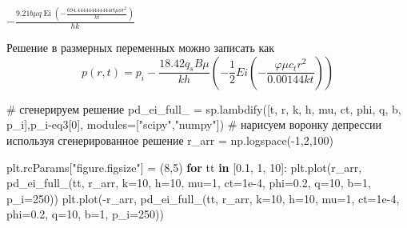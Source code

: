 \documentclass[
  russian,
  letterpaper,
  DIV=11,
  numbers=noendperiod,
  oneside]{scrartcl}
\newenvironment{Shaded}{\begin{snugshade}}{\end{snugshade}}
\newcommand{\CommentTok}[1]{\textcolor[rgb]{0.37,0.37,0.37}{#1}}
\newcommand{\ControlFlowTok}[1]{\textcolor[rgb]{0.00,0.23,0.31}{\textbf{#1}}}
\newcommand{\DecValTok}[1]{\textcolor[rgb]{0.68,0.00,0.00}{#1}}
\newcommand{\FloatTok}[1]{\textcolor[rgb]{0.68,0.00,0.00}{#1}}
\newcommand{\KeywordTok}[1]{\textcolor[rgb]{0.00,0.23,0.31}{\textbf{#1}}}
\newcommand{\NormalTok}[1]{\textcolor[rgb]{0.00,0.23,0.31}{#1}}
\newcommand{\OperatorTok}[1]{\textcolor[rgb]{0.37,0.37,0.37}{#1}}
\newcommand{\StringTok}[1]{\textcolor[rgb]{0.13,0.47,0.30}{#1}}
\begin{document}
$\displaystyle - \frac{9.21 b \mu q \operatorname{Ei}{\left(- \frac{694.444444444444 ct \mu \phi r^{2}}{k t} \right)}}{h k}$

Решение в размерных переменных можно записать как \[
p\left(r,t\right)=p_i-\frac{18.42q_sB\mu}{kh}\left(-\frac{1}{2} Ei \left(-\frac{\varphi\mu c_tr^2}{0.00144kt}\right)\right) 
\]

\begin{Shaded}
\begin{Highlighting}[]
\CommentTok{\# сгенерируем решение}
\NormalTok{pd\_ei\_full\_ }\OperatorTok{=}\NormalTok{ sp.lambdify([t, r, k, h, mu, ct, phi, q, b, p\_i],p\_i}\OperatorTok{{-}}\NormalTok{eq3[}\DecValTok{0}\NormalTok{], }
\NormalTok{                          modules}\OperatorTok{=}\NormalTok{[}\StringTok{"scipy"}\NormalTok{,}\StringTok{"numpy"}\NormalTok{]) }
                          \CommentTok{\# нарисуем воронку депрессии используя сгенерированное решение}
\NormalTok{r\_arr }\OperatorTok{=}\NormalTok{ np.logspace(}\OperatorTok{{-}}\DecValTok{1}\NormalTok{,}\DecValTok{2}\NormalTok{,}\DecValTok{100}\NormalTok{)}

\NormalTok{plt.rcParams[}\StringTok{"figure.figsize"}\NormalTok{] }\OperatorTok{=}\NormalTok{ (}\DecValTok{8}\NormalTok{,}\DecValTok{5}\NormalTok{)}
\ControlFlowTok{for}\NormalTok{ tt }\KeywordTok{in}\NormalTok{ [}\FloatTok{0.1}\NormalTok{, }\DecValTok{1}\NormalTok{, }\DecValTok{10}\NormalTok{]:}
\NormalTok{    plt.plot(r\_arr, }
\NormalTok{             pd\_ei\_full\_(tt, r\_arr, }
\NormalTok{                         k}\OperatorTok{=}\DecValTok{10}\NormalTok{, h}\OperatorTok{=}\DecValTok{10}\NormalTok{, mu}\OperatorTok{=}\DecValTok{1}\NormalTok{, ct}\OperatorTok{=}\FloatTok{1e{-}4}\NormalTok{, phi}\OperatorTok{=}\FloatTok{0.2}\NormalTok{, q}\OperatorTok{=}\DecValTok{10}\NormalTok{, b}\OperatorTok{=}\DecValTok{1}\NormalTok{, p\_i}\OperatorTok{=}\DecValTok{250}\NormalTok{))}
\NormalTok{    plt.plot(}\OperatorTok{{-}}\NormalTok{r\_arr, }
\NormalTok{             pd\_ei\_full\_(tt, r\_arr, }
\NormalTok{                         k}\OperatorTok{=}\DecValTok{10}\NormalTok{, h}\OperatorTok{=}\DecValTok{10}\NormalTok{, mu}\OperatorTok{=}\DecValTok{1}\NormalTok{, ct}\OperatorTok{=}\FloatTok{1e{-}4}\NormalTok{, phi}\OperatorTok{=}\FloatTok{0.2}\NormalTok{, q}\OperatorTok{=}\DecValTok{10}\NormalTok{, b}\OperatorTok{=}\DecValTok{1}\NormalTok{, p\_i}\OperatorTok{=}\DecValTok{250}\NormalTok{))}
\end{Highlighting}
\end{Shaded}
\end{document}
